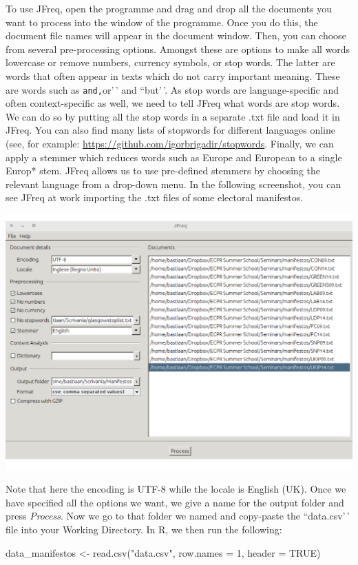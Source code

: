 \documentclass[
]{article}
\newenvironment{Shaded}{\begin{snugshade}}{\end{snugshade}}
\newcommand{\AttributeTok}[1]{\textcolor[rgb]{0.77,0.63,0.00}{#1}}
\newcommand{\ConstantTok}[1]{\textcolor[rgb]{0.00,0.00,0.00}{#1}}
\newcommand{\DecValTok}[1]{\textcolor[rgb]{0.00,0.00,0.81}{#1}}
\newcommand{\FunctionTok}[1]{\textcolor[rgb]{0.00,0.00,0.00}{#1}}
\newcommand{\NormalTok}[1]{#1}
\newcommand{\OtherTok}[1]{\textcolor[rgb]{0.56,0.35,0.01}{#1}}
\newcommand{\StringTok}[1]{\textcolor[rgb]{0.31,0.60,0.02}{#1}}
\begin{document}
To use JFreq, open the programme and drag and drop all the documents you want to process into the window of the programme. Once you do this, the document file names will appear in the document window. Then, you can choose from several pre-processing options. Amongst these are options to make all words lowercase or remove numbers, currency symbols, or stop words. The latter are words that often appear in texts which do not carry important meaning. These are words such as \texttt{and\textquotesingle{}\textquotesingle{},}or'\,' and ``but'\,'. As stop words are language-specific and often context-specific as well, we need to tell JFreq what words are stop words. We can do so by putting all the stop words in a separate .txt file and load it in JFreq. You can also find many lists of stopwords for different languages online (see, for example: \url{https://github.com/igorbrigadir/stopwords}. Finally, we can apply a stemmer which reduces words such as Europe and European to a single Europ* stem. JFreq allows us to use pre-defined stemmers by choosing the relevant language from a drop-down menu. In the following screenshot, you can see JFreq at work importing the .txt files of some electoral manifestos.

\begin{center}\includegraphics[width=0.75\linewidth]{figures/jfreq} \end{center}

Note that here the encoding is UTF-8 while the locale is English (UK). Once we have specified all the options we want, we give a name for the output folder and press \emph{Process}. Now we go to that folder we named and copy-paste the ``data.csv'\,' file into your Working Directory. In R, we then run the following:

\begin{Shaded}
\begin{Highlighting}[]
\NormalTok{data\_manifestos }\OtherTok{\textless{}{-}} \FunctionTok{read.csv}\NormalTok{(}\StringTok{"data.csv"}\NormalTok{, }\AttributeTok{row.names =} \DecValTok{1}\NormalTok{, }\AttributeTok{header =} \ConstantTok{TRUE}\NormalTok{)}
\end{Highlighting}
\end{Shaded}
\end{document}
